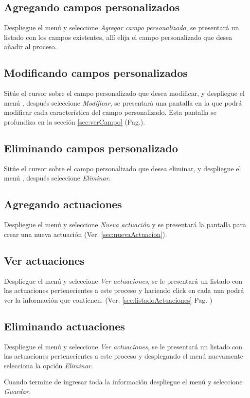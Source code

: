 \subsection{Agregando campos personalizados}
\label{sec:agregarCamposProceso}
Despliegue el men\'u \blackberry y seleccione \emph{Agregar campo personalizado}, se
presentar\'a un listado con los campos existentes, all\'i elija el campo
personalizado que desea a\~nadir al proceso.

\subsection{Modificando campos personalizados}
\label{sec:modificarCamposProceso}
Sit\'ue el cursor sobre el campo personalizado que desea modificar, y despliegue el
men\'u \blackberry, despu\'es seleccione \emph{Modificar},
se presentar\'a una pantalla en la que podr\'a modificar cada caracter\'istica
del campo personalizado. Esta pantalla se profundiza en la secci\'on
\ref{sec:verCampo} (Pag.\pageref{sec:verCampo}).

\subsection{Eliminando campos personalizado}
\label{sec:eliminarCamposProceso}
Sit\'ue el cursor sobre el campo personalizado que desea eliminar, y despliegue el
men\'u \blackberry, despu\'es seleccione \emph{Eliminar}.

\subsection{Agregando actuaciones}
\label{sec:agregarActuacionesProceso}
Despliegue el men\'u \blackberry y seleccione \emph{Nueva actuaci\'on} y se
presentar\'a la pantalla para crear una nueva actuaci\'on (Ver.
\ref{sec:nuevaActuacion}).

\subsection{Ver actuaciones}
\label{sec:verActuacionesProceso}
Despliegue el men\'u \blackberry y seleccione \emph{Ver actuaciones}, se le
presentar\'a un listado con las actuaciones pertenecientes a este proceso y
haciendo click en cada una podr\'a ver la informaci\'on que contienen. (Ver.
\ref{sec:listadoActuaciones} Pag. \pageref{sec:listadoActuaciones})

\subsection{Eliminando actuaciones}
\label{sec:eliminarActuacionesProceso}
Despliegue el men\'u \blackberry y seleccione \emph{Ver actuaciones}, se le
presentar\'a un listado con las actuaciones pertenecientes a este proceso y
desplegando el men\'u \blackberry nuevamente selecciona la opci\'on
\emph{Eliminar}.

Cuando termine de ingresar toda la informaci\'on despliegue el men\'u \blackberry y
seleccione \emph{Guardar}.

